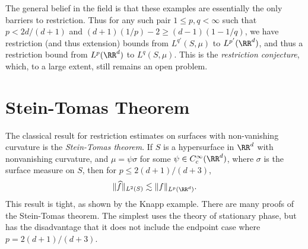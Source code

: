 The general belief in the field is that these examples are essentially the only barriers to restriction. Thus for any such pair $1 \leq p,q < \infty$ such that $p < 2d/(d+1)$ and $(d+1)(1/p) - 2 \geq (d-1)(1-1/q)$, we have restriction (and thus extension) bounds from $L^{q'}(S,\mu)$ to $L^{p'}(\RR^d)$, and thus a restriction bound from $L^p(\RR^d)$ to $L^q(S,\mu)$. This is the \emph{restriction conjecture}, which, to a large extent, still remains an open problem.



\section{Stein-Tomas Theorem}

The classical result for restriction estimates on surfaces with non-vanishing curvature is the \emph{Stein-Tomas theorem}. If $S$ is a hypersurface in $\RR^d$ with nonvanishing curvature, and $\mu = \psi \sigma$ for some $\psi \in C_c^\infty(\RR^d)$, where $\sigma$ is the surface measure on $S$, then for $p \leq 2(d+1)/(d+3)$,
%
\[ \| \widehat{f} \|_{L^2(S)} \lesssim \| f \|_{L^p(\RR^d)}. \]
%
This result is tight, as shown by the Knapp example. There are many proofs of the Stein-Tomas theorem. The simplest uses the theory of stationary phase, but has the disadvantage that it does not include the endpoint case where $p = 2(d+1)/(d+3)$.

